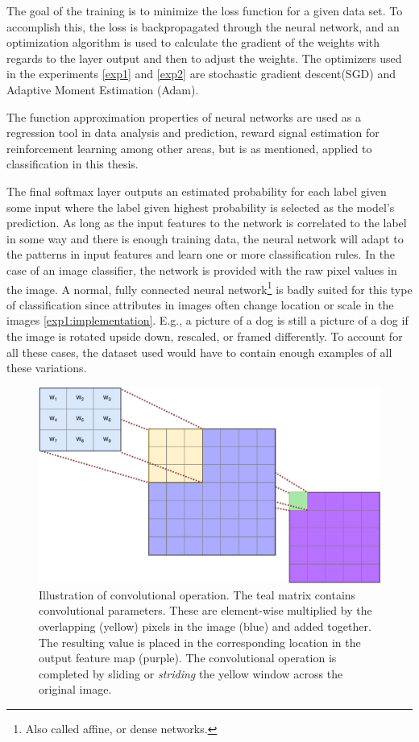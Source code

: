 The goal of the training is to minimize the loss function for a given data set. To accomplish this, the loss is backpropagated through the neural network, and an optimization algorithm is used to calculate the gradient of the weights with regards to the layer output and then to adjust the weights. The optimizers used in the experiments \ref{exp1} and \ref{exp2} are stochastic gradient descent(SGD)\cite{sgd} and Adaptive Moment Estimation (Adam)\cite{adam}. 

The function approximation properties of neural networks are used as a regression tool in data analysis and prediction, reward signal estimation for reinforcement learning among other areas, but is as mentioned, applied to classification in this thesis.

The final softmax layer outputs an estimated probability for each label given some input where the label given highest probability is selected as the model's prediction. As long as the input features to the network is correlated to the label in some way and there is enough training data, the neural network will adapt to the patterns in input features and learn one or more classification rules. In the case of an image classifier, the network is provided with the raw pixel values in the image. A normal, fully connected neural network\footnote{Also called affine, or dense networks.} is badly suited for this type of classification since attributes in images often change location or scale in the images \ref{exp1:implementation}. E.g., a picture of a dog is still a picture of a dog if the image is rotated upside down, rescaled, or framed differently. To account for all these cases, the dataset used would have to contain enough examples of all these variations.
\begin{figure}[ht] 
    \centering
    \includegraphics[width=\linewidth]{Chapters/2.Background/figures/convolution.pdf}
    \caption[Illustration of convolutional operation.]{Illustration of convolutional operation. The teal matrix contains convolutional parameters. These are element-wise multiplied by the overlapping (yellow) pixels in the image (blue) and added together. The resulting value is placed in the corresponding location in the output feature map (purple). The convolutional operation is completed by sliding or \textit{striding} the yellow window across the original image.}
    \label{fig:conv}
\end{figure}
